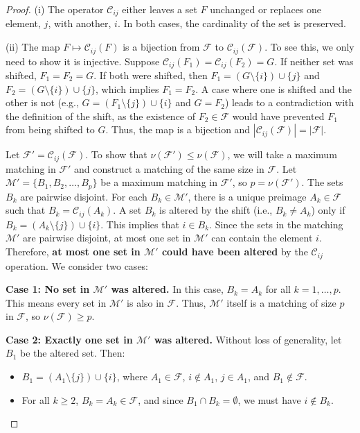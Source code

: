 \documentclass[10pt,a4paper]{amsart}
\begin{document}
\begin{proof}
	(i) The operator $\mathcal{C}_{ij}$ either leaves a set $F$ unchanged or replaces one element, $j$, with another, $i$. In both cases, the cardinality of the set is preserved.
	
	(ii) The map $F \mapsto \mathcal{C}_{ij}(F)$ is a bijection from $\mathcal{F}$ to $\mathcal{C}_{ij}(\mathcal{F})$. To see this, we only need to show it is injective. Suppose $\mathcal{C}_{ij}(F_1) = \mathcal{C}_{ij}(F_2) = G$. If neither set was shifted, $F_1 = F_2 = G$. If both were shifted, then $F_1 = (G \setminus \{i\}) \cup \{j\}$ and $F_2 = (G \setminus \{i\}) \cup \{j\}$, which implies $F_1 = F_2$. A case where one is shifted and the other is not (e.g., $G = (F_1 \setminus \{j\}) \cup \{i\}$ and $G=F_2$) leads to a contradiction with the definition of the shift, as the existence of $F_2 \in \mathcal{F}$ would have prevented $F_1$ from being shifted to $G$. Thus, the map is a bijection and $|\mathcal{C}_{ij}(\mathcal{F})| = |\mathcal{F}|$.
	
	Let $\mathcal{F}' = \mathcal{C}_{ij}(\mathcal{F})$. To show that $\nu(\mathcal{F}') \leq \nu(\mathcal{F})$, we will take a maximum matching in $\mathcal{F}'$ and construct a matching of the same size in $\mathcal{F}$.
	Let $\mathcal{M}' = \{B_1, B_2, \dots, B_p\}$ be a maximum matching in $\mathcal{F}'$, so $p = \nu(\mathcal{F}')$. The sets $B_k$ are pairwise disjoint. For each $B_k \in \mathcal{M}'$, there is a unique preimage $A_k \in \mathcal{F}$ such that $B_k = \mathcal{C}_{ij}(A_k)$.	
	A set $B_k$ is altered by the shift (i.e., $B_k \neq A_k$) only if $B_k = (A_k \setminus \{j\}) \cup \{i\}$. This implies that $i \in B_k$. Since the sets in the matching $\mathcal{M}'$ are pairwise disjoint, at most one set in $\mathcal{M}'$ can contain the element $i$. Therefore, \textbf{at most one set in $\mathcal{M}'$ could have been altered} by the $\mathcal{C}_{ij}$ operation.	
	We consider two cases:
	
	\textbf{Case 1: No set in $\mathcal{M}'$ was altered.}
	In this case, $B_k = A_k$ for all $k=1, \dots, p$. This means every set in $\mathcal{M}'$ is also in $\mathcal{F}$. Thus, $\mathcal{M}'$ itself is a matching of size $p$ in $\mathcal{F}$, so $\nu(\mathcal{F}) \ge p$.
	
	\textbf{Case 2: Exactly one set in $\mathcal{M}'$ was altered.}
	Without loss of generality, let $B_1$ be the altered set. Then:
	\begin{itemize}
		\item $B_1 = (A_1 \setminus \{j\}) \cup \{i\}$, where $A_1 \in \mathcal{F}$, $i \notin A_1$, $j \in A_1$, and $B_1 \notin \mathcal{F}$.
		\item For all $k \geq 2$, $B_k = A_k \in \mathcal{F}$, and since $B_1 \cap B_k = \emptyset$, we must have $i \notin B_k$.
	\end{itemize}
	

\end{proof}
\end{document}
